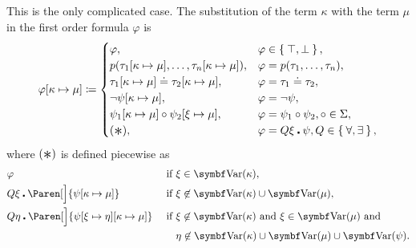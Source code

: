 \begin{definition}
\begin{DefEnum}
     This is the only complicated case. The substitution of the term \( \kappa \) with the term \( \mu \) in the first order formula \( \varphi \) is
    \begin{equation}\label{eq:def:first_order_substitution/term_in_formula}
      \varphi[\kappa \mapsto \mu] \coloneqq \begin{cases}
        \varphi,                                                           &\varphi \in \Set{ \top, \bot }, \\
        p(\tau_1[\kappa \mapsto \mu], \ldots, \tau_n[\kappa \mapsto \mu]), &\varphi = p(\tau_1, \ldots, \tau_n), \\
        \tau_1[\kappa \mapsto \mu] \doteq \tau_2[\kappa \mapsto \mu],      &\varphi = \tau_1 \doteq \tau_2, \\
        \neg \psi[\kappa \mapsto \mu],                                     &\varphi = \neg \psi, \\
        \psi_1[\kappa \mapsto \mu] \circ \psi_2[\xi \mapsto \mu],          &\varphi = \psi_1 \circ \psi_2, \circ \in \Sigma, \\
        (\Ast),                                                            &\varphi = Q \xi \centerdot \psi, Q \in \Set{ \forall, \exists },
      \end{cases}
    \end{equation}
    where \( (\Ast) \) is defined piecewise as
    \begin{align}
      &\varphi                                                                    &&\T{if} \xi \in \Bold{Var}(\kappa), \label{eq:def:first_order_substitution/term_in_formula/quantifiers/trivial} \\
      &Q \xi \centerdot \Paren[\Big]{\psi[\kappa \mapsto \mu]}                    &&\T{if} \xi \not\in \Bold{Var}(\kappa) \cup \Bold{Var}(\mu), \label{eq:def:first_order_substitution/term_in_formula/quantifiers/direct} \\
      &Q \eta \centerdot \Paren[\Big]{\psi[\xi \mapsto \eta][\kappa \mapsto \mu]} &&\T{if} \xi \not\in \Bold{Var}(\kappa) \T{and} \xi \in \Bold{Var}(\mu) \T{and} \label{eq:def:first_order_substitution/term_in_formula/quantifiers/renaming} \\
                                                                                  &&&\phantom{\T{if}} \eta \not\in \Bold{Var}(\kappa) \cup \Bold{Var}(\mu) \cup \Bold{Var}(\psi). \nonumber
    \end{align}


\end{DefEnum}
\end{definition}
